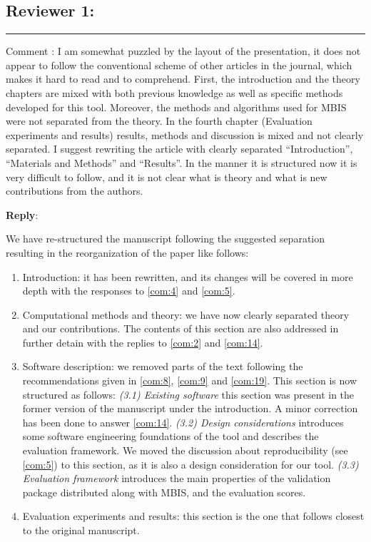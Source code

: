 \documentclass{memoir}
\newcounter{reviewpoint}
\newenvironment{reviewpoint}%
{\refstepcounter{reviewpoint}\par\medskip\vspace{3ex}\hrule\vspace{1.5ex}\par\noindent%
   {\fontseries{b}\selectfont Comment \arabic{reviewpoint}:} \fontshape{it}\selectfont }
{\label{com:\thereviewpoint}\par\medskip}
\newcommand{\reply}{\par\fontshape{n}\selectfont \noindent \textbf{Reply}:\ }
\begin{document}
\subsection*{Reviewer 1:}
\begin{reviewpoint}
I am somewhat puzzled by the layout of the presentation, it does not appear to follow 
  the conventional scheme of other articles in the journal, which makes it hard to 
  read and to comprehend. 
First, the introduction and the theory chapters are mixed with both previous knowledge 
  as well as specific methods developed for this tool. 
Moreover, the methods and algorithms used for MBIS were not separated from the theory. 
In the fourth chapter (Evaluation experiments and results) results, methods and discussion 
  is mixed and not clearly separated. I suggest rewriting the article with clearly 
  separated ``Introduction'', ``Materials and Methods'' and ``Results''. 
In the manner it is structured now it is very difficult to follow, and it is not clear what 
  is theory and what is new contributions from the authors.
\reply{We have re-structured the manuscript following the suggested separation resulting in the 
  reorganization of the paper like follows: 
\begin{enumerate}
\item Introduction: it has been rewritten, and its changes will be covered in more depth with the responses 
   to \autoref{com:4} and \autoref{com:5}.
\item Computational methods and theory: we have now clearly separated theory and our contributions. 
The contents of this section are also addressed in further detain with the replies to \autoref{com:2} and \autoref{com:14}.
\item Software description: we removed parts of the text following the recommendations given 
  in \autoref{com:8}, \autoref{com:9} and \autoref{com:19}. 
This section is now structured as follows: 
  \emph{(3.1) Existing software} this section was present in the former version of the manuscript under the introduction. 
A minor correction has been done to answer \autoref{com:14}.
  \emph{(3.2) Design considerations} introduces some software engineering foundations of the tool and describes 
  the evaluation framework. 
  We moved the discussion about reproducibility (see \autoref{com:5}) to this section, 
    as it is also a design consideration for our tool.
  \emph{(3.3) Evaluation framework} introduces the main properties of the validation package distributed along 
  with MBIS, and the evaluation scores.
\item Evaluation experiments and results: this section is the one that follows closest to the original manuscript. 

\end{enumerate}}
\end{reviewpoint}
\end{document}
